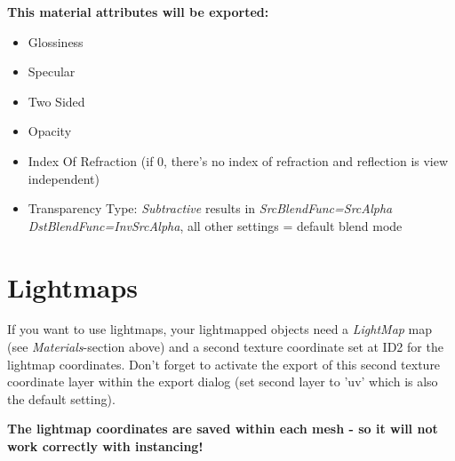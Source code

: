 \textbf{This material attributes will be exported:}
\begin{itemize}
\item{Glossiness}
\item{Specular}
\item{Two Sided}
\item{Opacity}
\item{Index Of Refraction (if 0, there's no index of refraction and reflection is view independent)}
\item{Transparency Type: \emph{Subtractive} results in \emph{SrcBlendFunc=SrcAlpha  DstBlendFunc=InvSrcAlpha}, all other settings = default blend mode}
\end{itemize}




\section{Lightmaps}
If you want to use lightmaps, your lightmapped objects need a \emph{LightMap} map (see \emph{Materials}-section above) and a second texture coordinate set at ID2 for the lightmap coordinates. Don't forget to activate the export of this second texture coordinate layer within the export dialog (set second layer to 'uv' which is also the default setting).

\textbf{The lightmap coordinates are saved within each mesh - so it will not work correctly with instancing!}
